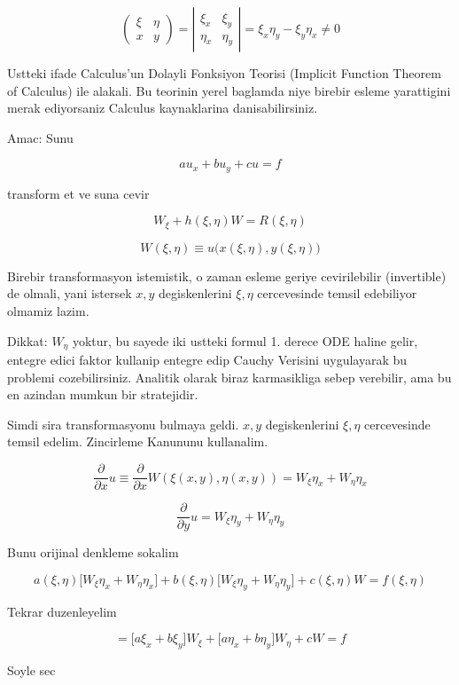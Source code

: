 \documentclass[12pt,fleqn]{article}
\begin{document}
\[ 
\left(\begin{array}{rr}
\xi & \eta \\
x & y
\end{array}\right) = 
\left|\begin{array}{rr}
\xi_x & \xi_y \\
\eta_x & \eta_y
\end{array}\right| =
\xi_x \eta_y - \xi_y \eta_x \ne 0
 \]

Ustteki ifade Calculus'un Dolayli Fonksiyon Teorisi (Implicit Function
Theorem of Calculus) ile alakali. Bu teorinin yerel baglamda niye birebir
esleme yarattigini merak ediyorsaniz Calculus kaynaklarina
danisabilirsiniz. 

Amac: Sunu 

\[ au_x + bu_y + cu = f \]

transform et ve suna cevir

\[ W_\xi + h(\xi, \eta)W = R(\xi,\eta)\]


\[ W(\xi,\eta) \equiv u \bigg( x(\xi,\eta),y(\xi,\eta) \bigg) \]

Birebir transformasyon istemistik, o zaman esleme geriye cevirilebilir
(invertible) de olmali, yani istersek $x,y$ degiskenlerini $\xi,\eta$
cercevesinde temsil edebiliyor olmamiz lazim. 

Dikkat: $W_\eta$ yoktur, bu sayede iki ustteki formul 1. derece ODE haline
gelir, entegre edici faktor kullanip entegre edip Cauchy Verisini
uygulayarak bu problemi cozebilirsiniz. Analitik olarak biraz karmasikliga
sebep verebilir, ama bu en azindan mumkun bir stratejidir. 

Simdi sira transformasyonu bulmaya geldi. $x,y$ degiskenlerini $\xi,\eta$
cercevesinde temsil edelim. Zincirleme Kanununu kullanalim. 

\[ \frac{\partial }{\partial x}u \equiv
\frac{\partial }{\partial x}W(\xi(x,y),\eta(x,y)) =
W_\xi\eta_x + W_\eta\eta_x 
 \]

\[ \frac{\partial }{\partial y}u =
W_\xi\eta_y + W_\eta\eta_y
 \]

Bunu orijinal denkleme sokalim

\[ 
a(\xi,\eta) \bigg[W_\xi \eta_x + W_\eta\eta_x \bigg] +
b(\xi,\eta) \bigg[W_\xi \eta_y + W_\eta\eta_y  \bigg] + 
c(\xi,\eta)W = f(\xi,\eta)
 \]

Tekrar duzenleyelim

\[ = 
\bigg[ a\xi_x + b\xi_y \bigg] W_\xi + 
\bigg[ a\eta_x + b\eta_y \bigg] W_\eta +
cW = f
 \]

Soyle sec
\end{document}

